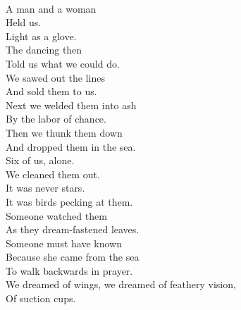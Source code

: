 \documentclass[smalldemyvopaper,11pt,twoside,onecolumn,openright,extrafontsizes]{memoir}
\newlength\drop
\begin{document}
\\A man and a woman
\\Held us.
\\Light as a glove.
\\The dancing then
\\Told us what we could do.
\\We sawed out the lines
\\And sold them to us.
\\Next we welded them into ash
\\By the labor of chance.
\\Then we thunk them down
\\And dropped them in the sea.
\\Six of us, alone.
\\We cleaned them out.
\\It was never stars.
\\It was birds pecking at them.
\\Someone watched them
\\As they dream-fastened leaves.
\\Someone must have known
\\Because she came from the sea
\\To walk backwards in prayer.
\\We dreamed of wings, we dreamed of feathery vision,
\\Of suction cups.
\end{document}
